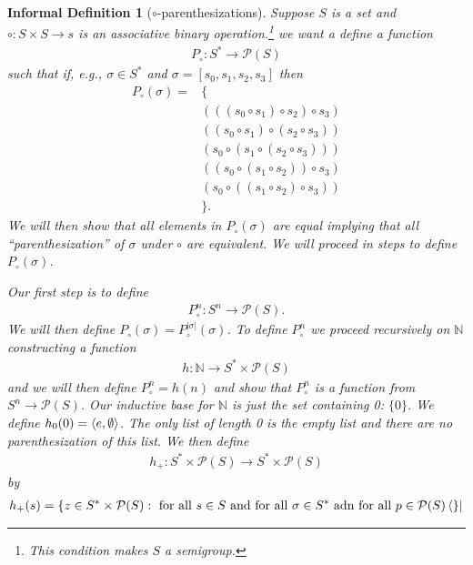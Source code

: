 \documentclass[12pt]{article}
\theoremstyle{break}
\theoremstyle{break}
\theoremstyle{break}
\theoremstyle{break}
\theoremstyle{break}
\newtheorem{informal definition}[definition]{Informal Definition}
\theoremstyle{break}
\newtheorem{informal theorem}[theorem]{Informal Theorem}
\newcommand{\natnum}[0]{\mathbb{N}}
\begin{document}
	\begin{informal definition}[$\circ$-parenthesizations]
		Suppose $S$ is a set and $\circ:S\times S \to s$ is an associative binary operation.\footnote{This condition makes $S$ a semigroup.}
		we want a define a function 
		\begin{align*}
			P_{\circ}: S^* \to \mathcal{P}(S)
		\end{align*}
		such that if, e.g., $\sigma \in S^*$ and $\sigma = [s_0, s_1, s_2, s_3]$ then
		\begin{align}
			P_{\circ}(\sigma) = &\{\\
				&(((s_0 \circ s_1) \circ s_2) \circ s_3)\\
				&((s_0 \circ s_1) \circ (s_2 \circ s_3))\\	
				&(s_0 \circ (s_1 \circ (s_2 \circ s_3)))\\
				&((s_0 \circ (s_1 \circ s_2)) \circ s_3)\\
				&(s_0 \circ ((s_1 \circ s_2) \circ s_3))\\				
			&\}.
		\end{align}
		We will then show that all elements in $P_{\circ}(\sigma)$ are equal implying that all ``parenthesization'' of $\sigma$ under $\circ$ are equivalent.
		We will proceed in steps to define $P_{\circ}(\sigma)$.
		
		Our first step is to define
		\begin{align*}
			P_{\circ}^n: S^n \to \mathcal{P}(S).
		\end{align*}
		We will then define $P_{\circ}(\sigma) = P_{\circ}^{|\sigma|}(\sigma)$.
		To define $P_{\circ}^n$ we proceed recursively on $\natnum$ constructing a function
		\begin{align*}
			h: \natnum \to S^* \times \mathcal{P}(S)
		\end{align*}
		and we will then define $P_{\circ}^n = h(n)$ and show that $P_{\circ}^n$ is a function from $S^n \to \mathcal{P}(S)$.
		Our inductive base for $\natnum$ is just the set containing 0: $\{0\}$.
		We define $h_0(0) = \braket{e, \emptyset}$.
		The only list of length 0 is the empty list and there are no parenthesization of this list.
		We then define
		\begin{align*}
			h_+: S^* \times \mathcal{P}(S) \to S^* \times \mathcal{P}(S)
		\end{align*}
		by
		\begin{align*}
			h_+(s) = \{z \in S^* \times \mathcal{P}(S): \text{ for all } s\in S \text{ and for all } \sigma \in S^* \text{ adn for all } p \in \mathcal{P}(S)\bra\}
		\end{align*}
		
		
	
	\end{informal definition}
	
\end{document}
